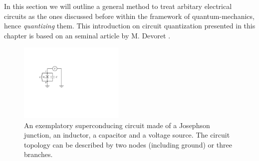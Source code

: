 In this section we will outline a general method to treat arbitary electrical circuits as the ones discussed before within the framework of quantum-mechanics, hence {\it quantizing} them. This introduction on circuit quantization presented in this chapter is based on an seminal article by M. Devoret \cite{devoret_quantum_1995}.

\begin{figure}
	\includegraphics[width=5cm]{"./material/figures/introduction/sample_circuit"}
	\caption{An exemplatory superconducing circuit made of a Josephson junction, an inductor, a capacitor and a voltage source. The circuit topology can be described by two nodes (including ground) or three branches.}
	\label{fig:SampleCircuit}
\end{figure}

